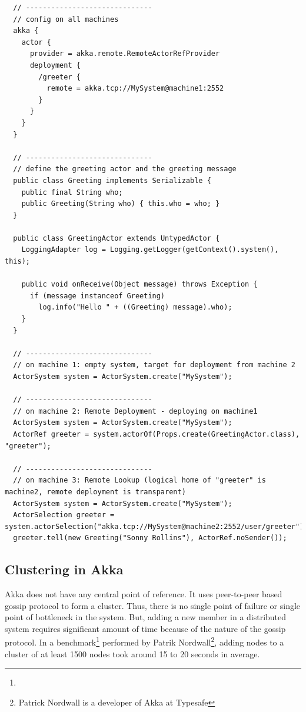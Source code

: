 \begin{lstlisting}
  // ------------------------------
  // config on all machines
  akka {
    actor {
      provider = akka.remote.RemoteActorRefProvider
      deployment {
        /greeter {
          remote = akka.tcp://MySystem@machine1:2552
        }
      }
    }
  }

  // ------------------------------
  // define the greeting actor and the greeting message
  public class Greeting implements Serializable {
    public final String who;
    public Greeting(String who) { this.who = who; }
  }

  public class GreetingActor extends UntypedActor {
    LoggingAdapter log = Logging.getLogger(getContext().system(), this);

    public void onReceive(Object message) throws Exception {
      if (message instanceof Greeting)
        log.info("Hello " + ((Greeting) message).who);
    }
  }

  // ------------------------------
  // on machine 1: empty system, target for deployment from machine 2
  ActorSystem system = ActorSystem.create("MySystem");

  // ------------------------------
  // on machine 2: Remote Deployment - deploying on machine1
  ActorSystem system = ActorSystem.create("MySystem");
  ActorRef greeter = system.actorOf(Props.create(GreetingActor.class), "greeter");

  // ------------------------------
  // on machine 3: Remote Lookup (logical home of "greeter" is machine2, remote deployment is transparent)
  ActorSystem system = ActorSystem.create("MySystem");
  ActorSelection greeter = system.actorSelection("akka.tcp://MySystem@machine2:2552/user/greeter");
  greeter.tell(new Greeting("Sonny Rollins"), ActorRef.noSender());
\end{lstlisting}

  \subsection{Clustering in Akka}
  Akka does not have any central point of reference. It uses peer-to-peer based gossip protocol to form a cluster. Thus, there is no single point of failure or single point of bottleneck in the system. But, adding a new member in a distributed system requires significant amount of time because of the nature of the gossip protocol. In a benchmark\footnote{} performed by Patrik Nordwall\footnote{Patrick Nordwall is a developer of Akka at Typesafe}, adding nodes to a cluster of at least 1500 nodes took around 15 to 20 seconds in average.


